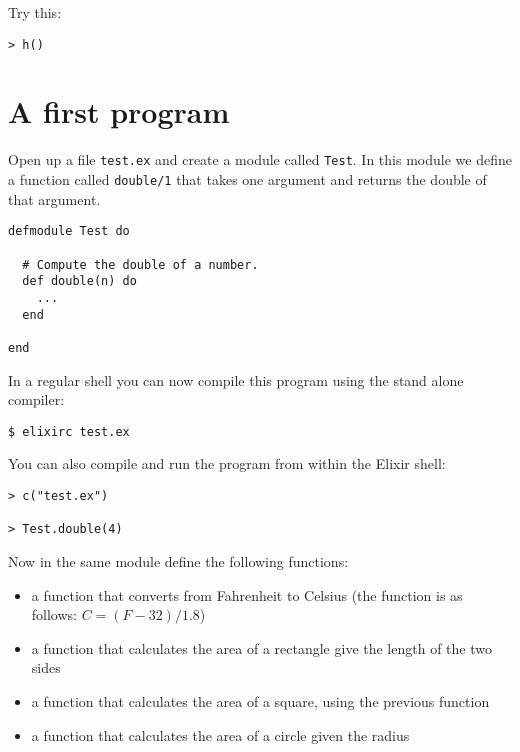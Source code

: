 \documentclass[a4paper,11pt]{article}
\begin{document}
Try this:

\begin{verbatim}
> h()
\end{verbatim}



\section{A first program}

Open up a file {\tt test.ex} and create a module called {\tt Test}. In
this module we define a function called {\tt double/1} that takes one
argument and returns the double of that argument.

\begin{verbatim}
defmodule Test do

  # Compute the double of a number.
  def double(n) do
    ...
  end
  
end
\end{verbatim}

In a regular shell you can now compile this program using the stand alone compiler:

\begin{verbatim}
$ elixirc test.ex
\end{verbatim}

You can also compile and run the program from within the Elixir shell:

\begin{verbatim}
> c("test.ex")

> Test.double(4)
\end{verbatim}

Now in the same module define the following functions:

\begin{itemize}
\item a function that converts from Fahrenheit to Celsius (the
  function is as follows: $C = (F-32)/1.8$)

\item a function that calculates the area of a rectangle give the
  length of the two sides

\item a function that calculates the area of a square, using the
  previous function

\item a function that calculates the area of a circle given the radius
\end{itemize}
\end{document}

